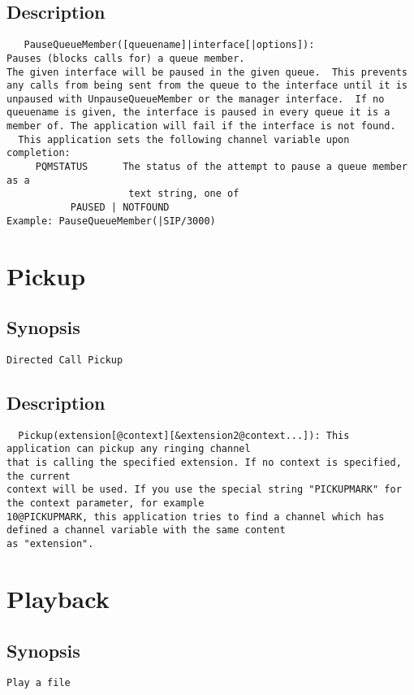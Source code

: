 \subsection{Description}
\begin{verbatim}
   PauseQueueMember([queuename]|interface[|options]):
Pauses (blocks calls for) a queue member.
The given interface will be paused in the given queue.  This prevents
any calls from being sent from the queue to the interface until it is
unpaused with UnpauseQueueMember or the manager interface.  If no
queuename is given, the interface is paused in every queue it is a
member of. The application will fail if the interface is not found.
  This application sets the following channel variable upon completion:
     PQMSTATUS      The status of the attempt to pause a queue member as a
                     text string, one of
           PAUSED | NOTFOUND
Example: PauseQueueMember(|SIP/3000)

\end{verbatim}


\section{Pickup}
\subsection{Synopsis}
\begin{verbatim}
Directed Call Pickup
\end{verbatim}
\subsection{Description}
\begin{verbatim}
  Pickup(extension[@context][&extension2@context...]): This application can pickup any ringing channel
that is calling the specified extension. If no context is specified, the current
context will be used. If you use the special string "PICKUPMARK" for the context parameter, for example
10@PICKUPMARK, this application tries to find a channel which has defined a channel variable with the same content
as "extension".
\end{verbatim}


\section{Playback}
\subsection{Synopsis}
\begin{verbatim}
Play a file
\end{verbatim}
